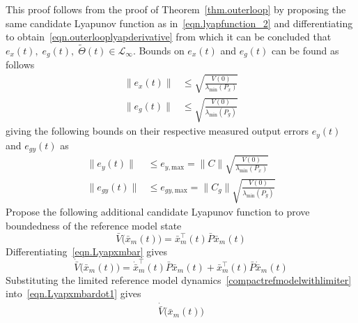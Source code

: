 \begin{proof-dan}
  This proof follows from the proof of Theorem~\ref{thm.outerloop} by proposing the same candidate Lyapunov function as in\ \eqref{eqn.lyapfunction_2} and differentiating to obtain\ \eqref{eqn.outerlooplyapderivative} from which it can be concluded that $e_{x}(t), \; e_{g}(t) , \;\widetilde{\Theta}(t)\in\mathcal{L}_{\infty}$.
  Bounds on $e_{x}(t)$ and $e_{g}(t)$ can be found as follows
  \begin{equation}
    \label{eqn.boundaonexandeg}
    \begin{split}
      \|e_{x}(t)\|
      & \leq
      \sqrt{\frac{V(0)}{\lambda_{\text{min}}(P_{x})}} \\
      \|e_{g}(t)\|
      & \leq
      \sqrt{\frac{V(0)}{\lambda_{\text{min}}(P_{g})}}
    \end{split}
  \end{equation}
  giving the following bounds on their respective measured output errors $e_{y}(t)$ and $e_{gy}(t)$ as
  \begin{equation}
    \label{eqn.boundaoneyandegy}
    \begin{split}
      \|e_{y}(t)\|
      & \leq
      e_{y,\text{max}}
      =
      \|C\|
      \sqrt{\frac{V(0)}{\lambda_{\text{min}}(P_{x})}} \\
      \|e_{gy}(t)\|
      & \leq
      e_{gy,\text{max}}
      =
      \|C_{g}\|
      \sqrt{\frac{V(0)}{\lambda_{\text{min}}(P_{g})}}
    \end{split}
  \end{equation}
  Propose the following additional candidate Lyapunov function to prove boundedness of the reference model state
  \begin{equation}
    \label{eqn.Lyapxmbar}
    \bar{V}\bigr(\bar{x}_{m}(t)\bigr) = \bar{x}_{m}^{\top}(t)\bar{P}\bar{x}_{m}(t)
  \end{equation}
  Differentiating\ \eqref{eqn.Lyapxmbar} gives
  \begin{equation}
    \label{eqn.Lyapxmbardot1}
    \dot{\bar{V}}\bigr(\bar{x}_{m}(t)\bigr)
    =
    \dot{\bar{x}}_{m}^{\top}(t)\bar{P}\bar{x}_{m}(t)
    + \bar{x}_{m}^{\top}(t)\bar{P}\dot{\bar{x}}_{m}(t)
  \end{equation}
  Substituting the limited reference model dynamics\ \eqref{compactrefmodelwithlimiter} into\ \eqref{eqn.Lyapxmbardot1} gives
  \begin{equation}
    \label{eqn.Lyapxmbardot2}
    \begin{split}
      \dot{\bar{V}}\bigr(\bar{x}_{m}(t)\bigr)

\end{split}
\end{equation}
\end{proof-dan}
